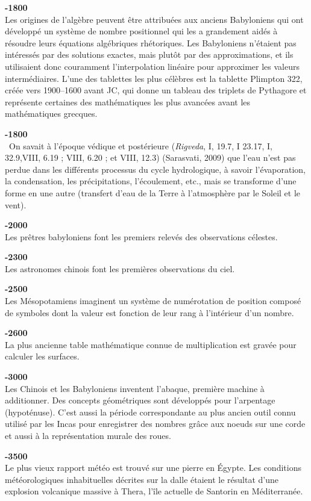 \textbf{-1800}\\
Les origines de l'algèbre peuvent être attribuées aux anciens Babyloniens qui ont développé un système de nombre positionnel qui les a grandement aidés à résoudre leurs équations algébriques rhétoriques. Les Babyloniens n'étaient pas intéressés par des solutions exactes, mais plutôt par des approximations, et ils utilisaient donc couramment l'interpolation linéaire pour approximer les valeurs intermédiaires.  L'une des tablettes les plus célèbres est la tablette Plimpton 322, créée vers 1900–1600 avant JC, qui donne un tableau des triplets de Pythagore et représente certaines des mathématiques les plus avancées avant les mathématiques grecques.

\textbf{-1800}\\\
On savait à l'époque védique et postérieure (\textit{Rigveda}, I, 19.7, I 23.17, I, 32.9,VIII, 6.19 ; VIII, 6.20 ; et VIII, 12.3) (Sarasvati, 2009) que l'eau n'est pas perdue dans les différents processus du cycle hydrologique, à savoir l'évaporation, la condensation, les précipitations, l'écoulement, etc., mais se transforme d'une forme en une autre (transfert d'eau de la Terre à l'atmosphère par le Soleil et le vent).

\textbf{-2000}\\
Les prêtres babyloniens font les premiers relevés des observations célestes.

\textbf{-2300}\\
Les astronomes chinois font les premières observations du ciel.

\textbf{-2500}\\
Les Mésopotamiens imaginent un système de numérotation de position composé de symboles dont la valeur est fonction de leur rang à l'intérieur d'un nombre.

\textbf{-2600}\\
La plus ancienne table mathématique connue de multiplication est gravée pour calculer les surfaces.

\textbf{-3000}\\
Les Chinois et les Babyloniens inventent l'abaque, première machine à additionner. Des concepts géométriques sont développés pour l'arpentage (hypoténuse). C'est aussi la période correspondante au plus ancien outil connu utilisé par les Incas pour enregistrer des nombres grâce aux noeuds sur une corde et aussi à la représentation murale des roues.

\textbf{-3500}\\
Le plus vieux rapport météo est trouvé sur une pierre en Égypte. Les conditions météorologiques inhabituelles décrites sur la dalle étaient le résultat d'une explosion volcanique massive à Thera, l'île actuelle de Santorin en Méditerranée.

